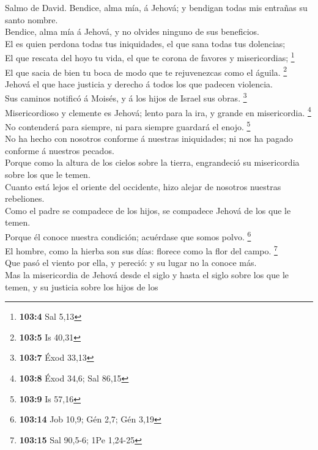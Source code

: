  Salmo de David. Bendice, alma mía, á Jehová; y bendigan
todas mis entrañas su santo nombre.\\
 Bendice, alma mía á Jehová, y no olvides ninguno de sus
beneficios.\\
 El es quien perdona todas tus iniquidades, el que sana
todas tus dolencias;\\
 El que rescata del hoyo tu vida, el que te corona de
favores y misericordias; \footnote{\textbf{103:4} Sal 5,13}\\
 El que sacia de bien tu boca de modo que te rejuvenezcas
como el águila. \footnote{\textbf{103:5} Is 40,31}\\
 Jehová el que hace justicia y derecho á todos los que
padecen violencia.\\
 Sus caminos notificó á Moisés, y á los hijos de Israel
sus obras. \footnote{\textbf{103:7} Éxod 33,13}\\
 Misericordioso y clemente es Jehová; lento para la ira, y
grande en misericordia. \footnote{\textbf{103:8} Éxod 34,6; Sal 86,15}\\
 No contenderá para siempre, ni para siempre guardará el
enojo. \footnote{\textbf{103:9} Is 57,16}\\
 No ha hecho con nosotros conforme á nuestras
iniquidades; ni nos ha pagado conforme á nuestros pecados.\\
 Porque como la altura de los cielos sobre la tierra,
engrandeció su misericordia sobre los que le temen.\\
 Cuanto está lejos el oriente del occidente, hizo alejar
de nosotros nuestras rebeliones.\\
 Como el padre se compadece de los hijos, se compadece
Jehová de los que le temen.\\
 Porque él conoce nuestra condición; acuérdase que somos
polvo. \footnote{\textbf{103:14} Job 10,9; Gén 2,7; Gén 3,19}\\
 El hombre, como la hierba son sus días: florece como la
flor del campo. \footnote{\textbf{103:15} Sal 90,5-6; 1Pe 1,24-25}\\
 Que pasó el viento por ella, y pereció: y su lugar no la
conoce más.\\
 Mas la misericordia de Jehová desde el siglo y hasta el
siglo sobre los que le temen, y su justicia sobre los hijos de los
